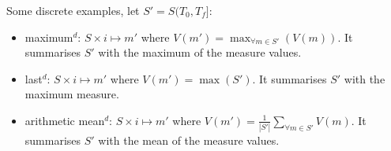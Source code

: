 Some discrete examples,
let $S'=S(T_0,T_f]$:
\begin{itemize}
\item maximum$^d$: $S \times i \mapsto m'$ where $V(m') = \max_{\forall m
    \in S'}(V(m))$. It summarises $S'$ with the maximum of
  the measure values.
\item last$^d$: $S \times i \mapsto m'$ where $V(m') = \max(S')$. It
  summarises $S'$ with the maximum measure.
\item arithmetic mean$^d$: $S \times i \mapsto m'$ where $V(m') =
  \frac{1}{|S'|} \sum\limits_{\forall m\in S'} V(m)$. It
  summarises $S'$ with the mean of the measure values.
\end{itemize}






